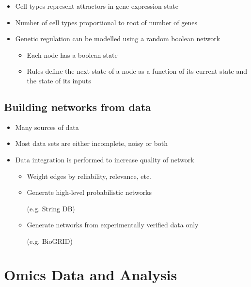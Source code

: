 \documentclass[a4paper]{article}
\begin{document}
\begin{itemize}
  \item
    Cell types represent attractors in gene expression state

  \item
    Number of cell types proportional to root of number of genes

  \item
    Genetic regulation can be modelled using a random boolean network

    \begin{itemize}
      \item
        Each node has a boolean state

      \item
        Rules define the next state of a node as a function of its current state
        and the state of its inputs
    \end{itemize}
\end{itemize}

\subsection{Building networks from data}

\begin{itemize}
  \item
    Many sources of data

  \item
    Most data sets are either incomplete, noisy or both

  \item
    Data integration is performed to increase quality of network

    \begin{itemize}
      \item
        Weight edges by reliability, relevance, etc.

      \item
        Generate high-level probabilistic networks

        (e.g. String DB)

      \item
        Generate networks from experimentally verified data only

        (e.g. BioGRID)
    \end{itemize}
\end{itemize}

\section{Omics Data and Analysis}
\end{document}
